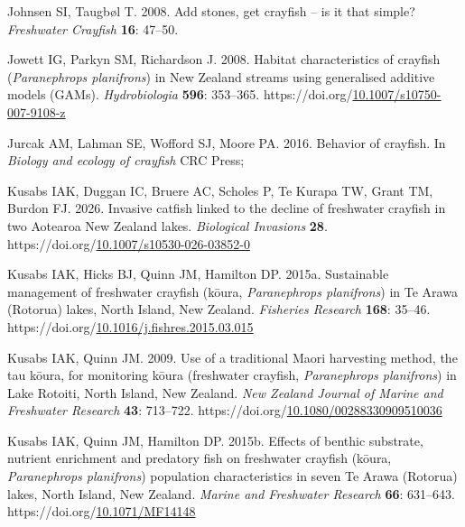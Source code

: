 \documentclass[
  letterpaper,
  DIV=11,
  numbers=noendperiod]{scrartcl}
\newlength{\cslhangindent}
\newenvironment{CSLReferences}[2] %
 {\begin{list}{}{%
  \setlength{\itemindent}{0pt}
  \setlength{\leftmargin}{0pt}
  \setlength{\parsep}{0pt}
  \ifodd #1
   \setlength{\leftmargin}{\cslhangindent}
   \setlength{\itemindent}{-1\cslhangindent}
  \fi
  \setlength{\itemsep}{#2\baselineskip}}}
 {\end{list}}
\begin{document}
\begin{CSLReferences}{1}{0}
Johnsen SI, Taugbøl T. 2008. Add stones, get crayfish -- is it that
simple? \emph{Freshwater Crayfish} \textbf{16}: 47--50.

Jowett IG, Parkyn SM, Richardson J. 2008. Habitat characteristics of
crayfish ({\emph{Paranephrops planifrons}}) in {New Zealand} streams
using generalised additive models ({GAMs}). \emph{Hydrobiologia}
\textbf{596}: 353--365.
https://doi.org/\href{https://doi.org/10.1007/s10750-007-9108-z}{10.1007/s10750-007-9108-z}

Jurcak AM, Lahman SE, Wofford SJ, Moore PA. 2016. Behavior of crayfish.
In \emph{Biology and ecology of crayfish} CRC Press;

Kusabs IAK, Duggan IC, Bruere AC, Scholes P, Te Kurapa TW, Grant TM,
Burdon FJ. 2026. Invasive catfish linked to the decline of freshwater
crayfish in two {Aotearoa New Zealand} lakes. \emph{Biological
Invasions} \textbf{28}.
https://doi.org/\href{https://doi.org/10.1007/s10530-026-03852-0}{10.1007/s10530-026-03852-0}

Kusabs IAK, Hicks BJ, Quinn JM, Hamilton DP. 2015a. Sustainable
management of freshwater crayfish (k{ō}ura, {\emph{Paranephrops
planifrons}}) in {Te Arawa} ({Rotorua}) lakes, {North Island, New
Zealand}. \emph{Fisheries Research} \textbf{168}: 35--46.
https://doi.org/\href{https://doi.org/10.1016/j.fishres.2015.03.015}{10.1016/j.fishres.2015.03.015}

Kusabs IAK, Quinn JM. 2009. Use of a traditional {Maori} harvesting
method, the tau kōura, for monitoring kōura (freshwater crayfish,
{\emph{Paranephrops planifrons}}) in {Lake Rotoiti}, {North Island, New
Zealand}. \emph{New Zealand Journal of Marine and Freshwater Research}
\textbf{43}: 713--722.
https://doi.org/\href{https://doi.org/10.1080/00288330909510036}{10.1080/00288330909510036}

Kusabs IAK, Quinn JM, Hamilton DP. 2015b. Effects of benthic substrate,
nutrient enrichment and predatory fish on freshwater crayfish (k{ō}ura,
{\emph{Paranephrops planifrons}}) population characteristics in seven
{Te Arawa} ({Rotorua}) lakes, {North Island, New Zealand}. \emph{Marine
and Freshwater Research} \textbf{66}: 631--643.
https://doi.org/\href{https://doi.org/10.1071/MF14148}{10.1071/MF14148}


\end{CSLReferences}
\end{document}
